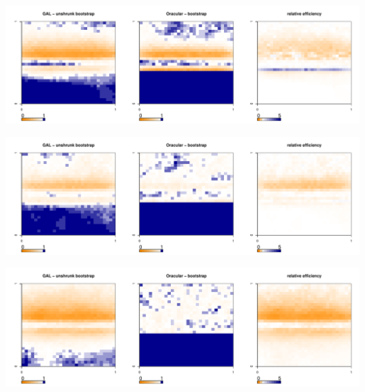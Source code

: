 \documentclass[authoryear, review, 11pt]{elsarticle}
\begin{document}
	\begin{center}
		\includegraphics[width=0.99\textwidth]{../../figures/X1-28-4.pdf}
	\end{center}
        
	\begin{center}
		\includegraphics[width=0.99\textwidth]{../../figures/X1-28-5.pdf}
		\label{fig:coveragemap5}
	\end{center}
	
	\begin{center}
		\includegraphics[width=0.99\textwidth]{../../figures/X1-28-6.pdf}
		\label{fig:coveragemap6}
	\end{center}
	
\end{document}
